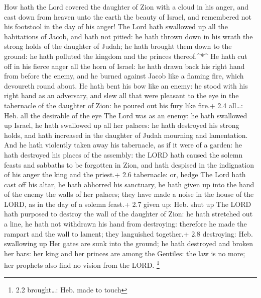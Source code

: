  How hath the Lord covered the daughter of Zion with a cloud
in his anger, and cast down from heaven unto the earth the beauty of
Israel, and remembered not his footstool in the day of his anger!
 The Lord hath swallowed up all the habitations of Jacob,
and hath not pitied: he hath thrown down in his wrath the strong holds
of the daughter of Judah; he hath brought them down to the ground: he
hath polluted the kingdom and the princes thereof.\^{}*\^{} 
He hath cut off in his fierce anger all the horn of Israel: he hath
drawn back his right hand from before the enemy, and he burned against
Jacob like a flaming fire, which devoureth round about.  He
hath bent his bow like an enemy: he stood with his right hand as an
adversary, and slew all that were pleasant to the eye in the tabernacle
of the daughter of Zion: he poured out his fury like fire.+ 2.4
all\ldots: Heb. all the desirable of the eye  The Lord was
as an enemy: he hath swallowed up Israel, he hath swallowed up all her
palaces: he hath destroyed his strong holds, and hath increased in the
daughter of Judah mourning and lamentation.  And he hath
violently taken away his tabernacle, as if it were of a garden: he hath
destroyed his places of the assembly: the LORD hath caused the solemn
feasts and sabbaths to be forgotten in Zion, and hath despised in the
indignation of his anger the king and the priest.+ 2.6 tabernacle: or,
hedge  The Lord hath cast off his altar, he hath abhorred
his sanctuary, he hath given up into the hand of the enemy the walls of
her palaces; they have made a noise in the house of the LORD, as in the
day of a solemn feast.+ 2.7 given up: Heb. shut up  The LORD
hath purposed to destroy the wall of the daughter of Zion: he hath
stretched out a line, he hath not withdrawn his hand from destroying:
therefore he made the rampart and the wall to lament; they languished
together.+ 2.8 destroying: Heb. swallowing up  Her gates are
sunk into the ground; he hath destroyed and broken her bars: her king
and her princes are among the Gentiles: the law is no more; her prophets
also find no vision from the LORD. \footnote{2.2 brought\ldots: Heb.
  made to touch}

